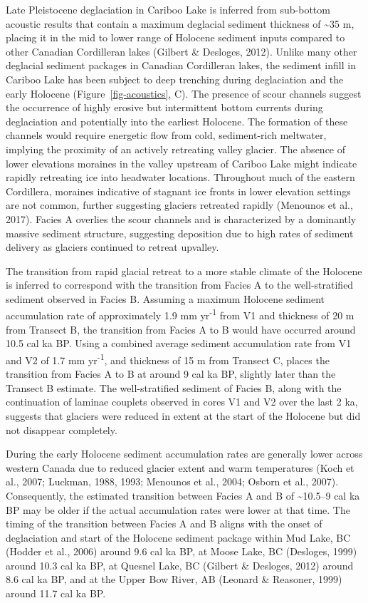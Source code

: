 \documentclass[
  letterpaper,
  DIV=11,
  numbers=noendperiod]{scrartcl}
\begin{document}
Late Pleistocene deglaciation in Cariboo Lake is inferred from
sub-bottom acoustic results that contain a maximum deglacial sediment
thickness of \textasciitilde35 m, placing it in the mid to lower range
of Holocene sediment inputs compared to other Canadian Cordilleran lakes
(Gilbert \& Desloges, 2012). Unlike many other deglacial sediment
packages in Canadian Cordilleran lakes, the sediment infill in Cariboo
Lake has been subject to deep trenching during deglaciation and the
early Holocene (Figure~\ref{fig-acoustics}, C). The presence of scour
channels suggest the occurrence of highly erosive but intermittent
bottom currents during deglaciation and potentially into the earliest
Holocene. The formation of these channels would require energetic flow
from cold, sediment-rich meltwater, implying the proximity of an
actively retreating valley glacier. The absence of lower elevations
moraines in the valley upstream of Cariboo Lake might indicate rapidly
retreating ice into headwater locations. Throughout much of the eastern
Cordillera, moraines indicative of stagnant ice fronts in lower
elevation settings are not common, further suggesting glaciers retreated
rapidly (Menounos et al., 2017). Facies A overlies the scour channels
and is characterized by a dominantly massive sediment structure,
suggesting deposition due to high rates of sediment delivery as glaciers
continued to retreat upvalley.

The transition from rapid glacial retreat to a more stable climate of
the Holocene is inferred to correspond with the transition from Facies A
to the well-stratified sediment observed in Facies B. Assuming a maximum
Holocene sediment accumulation rate of approximately 1.9 mm
yr\textsuperscript{-1} from V1 and thickness of 20 m from Transect B,
the transition from Facies A to B would have occurred around 10.5 cal ka
BP. Using a combined average sediment accumulation rate from V1 and V2
of 1.7 mm yr\textsuperscript{-1}, and thickness of 15 m from Transect C,
places the transition from Facies A to B at around 9 cal ka BP, slightly
later than the Transect B estimate. The well-stratified sediment of
Facies B, along with the continuation of laminae couplets observed in
cores V1 and V2 over the last 2 ka, suggests that glaciers were reduced
in extent at the start of the Holocene but did not disappear completely.

During the early Holocene sediment accumulation rates are generally
lower across western Canada due to reduced glacier extent and warm
temperatures (Koch et al., 2007; Luckman, 1988, 1993; Menounos et al.,
2004; Osborn et al., 2007). Consequently, the estimated transition
between Facies A and B of \textasciitilde10.5--9 cal ka BP may be older
if the actual accumulation rates were lower at that time. The timing of
the transition between Facies A and B aligns with the onset of
deglaciation and start of the Holocene sediment package within Mud Lake,
BC (Hodder et al., 2006) around 9.6 cal ka BP, at Moose Lake, BC
(Desloges, 1999) around 10.3 cal ka BP, at Quesnel Lake, BC (Gilbert \&
Desloges, 2012) around 8.6 cal ka BP, and at the Upper Bow River, AB
(Leonard \& Reasoner, 1999) around 11.7 cal ka BP.
\end{document}
